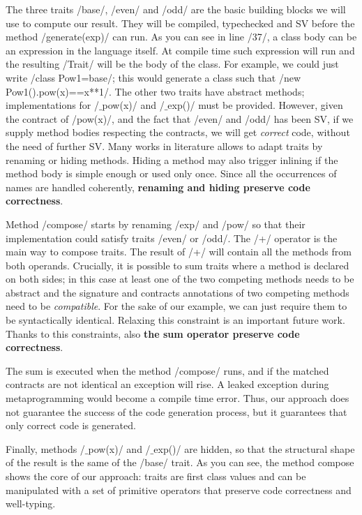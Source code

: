 The three traits /base/, /even/ and /odd/ are the basic building blocks we will use to compute our result. They will be compiled, typechecked and SV before the method /generate(exp)/ can run.
As you can see in line /37/, a class body can be an expression in the language itself.
At compile time such expression will run and the resulting /Trait/ will be the body of the class.
For example, we could just write /class Pow1=base/; this would generate a class such that /new Pow1().pow(x)==x**1/.
The other two traits have abstract methods; implementations for /$\_$pow(x)/ and /$\_$exp()/ must be provided. However, given the contract of /pow(x)/,
and the fact that /even/ and /odd/ has been SV,
if we supply method bodies respecting the contracts, we will get \emph{correct} code, without the need of further SV.
Many works in literature allows to adapt traits by renaming or hiding methods\cite{servetto2014meta,reppy2007metaprogramming,liquori2008feathertrait}. Hiding a method may also trigger inlining if the method body is simple enough or used only once.
Since all the occurrences of names are handled coherently, \textbf{renaming and hiding preserve code correctness}.

Method /compose/ starts by renaming /exp/ and /pow/
so that their implementation could satisfy traits 
/even/ or /odd/.
The /+/ operator is the main way to compose traits.
The result of /+/ will contain all the methods from both operands.
Crucially, it is possible to sum traits where a method is declared on both sides; in this case at least one of the two competing methods needs to be abstract and the signature and contracts annotations of two competing methods need to be \emph{compatible}.
For the sake of our example, we can just require them to be syntactically identical. Relaxing this constraint is an important future work.
Thanks to this constraints, also \textbf{the sum operator preserve code correctness}.

The sum is executed when the method /compose/ runs, and if the matched contracts are not identical an exception will rise. A leaked exception during metaprogramming would become a compile time error.
Thus, our approach does not guarantee the success of the code generation process, but it guarantees that only correct code is generated.

Finally, methods /$\_$pow(x)/ and /$\_$exp()/ are hidden, so that the structural shape of the result is
the same of the /base/ trait.
As you can see, the method compose shows the core of our approach: traits are first class values and can be manipulated with a set of primitive operators that preserve code correctness and well-typing.

